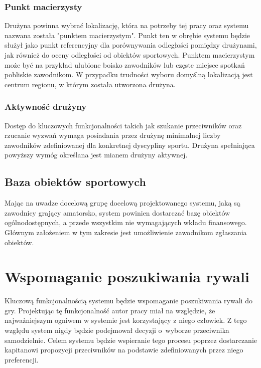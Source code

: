 \subsubsection{Punkt macierzysty}

Drużyna powinna wybrać lokalizację, która na potrzeby tej pracy oraz systemu nazwana została "punktem macierzystym". Punkt ten w obrębie systemu będzie służył jako punkt referencyjny dla porównywania odległości pomiędzy drużynami, jak również do oceny odległości od obiektów sportowych. Punktem macierzystym może być na przykład ulubione boisko zawodników lub częste miejsce spotkań pobliskie zawodnikom. W przypadku trudności wyboru domyślną lokalizacją jest centrum regionu, w którym została utworzona drużyna.

\subsubsection{Aktywność drużyny}

Dostęp do kluczowych funkcjonalności takich jak szukanie przeciwników oraz rzucanie wyzwań wymaga posiadania przez drużynę minimalnej liczby zawodników zdefiniowanej dla konkretnej dyscypliny sportu. Drużyna spełniająca powyższy wymóg określana jest mianem drużyny aktywnej.

\subsection{Baza obiektów sportowych}

Mając na uwadze docelową grupę docelową projektowanego systemu, jaką są zawodnicy grający amatorsko, system powinien dostarczać bazę obiektów ogólnodostępnych, a przede wszystkim nie wymagających wkładu finansowego. Głównym założeniem w tym zakresie jest umożliwienie zawodnikom zgłaszania obiektów. 

\section{Wspomaganie poszukiwania rywali}

Kluczową funkcjonalnością systemu będzie wspomaganie poszukiwania rywali do gry. Projektując tę funkcjonalność autor pracy miał na względzie, że najważniejszym ogniwem w systemie jest korzystający z niego człowiek. Z tego względu system nigdy będzie podejmował decyzji o~wyborze przeciwnika samodzielnie. Celem systemu będzie wspieranie tego procesu poprzez dostarczanie kapitanowi propozycji przeciwników na podstawie zdefiniowanych przez niego preferencji.


